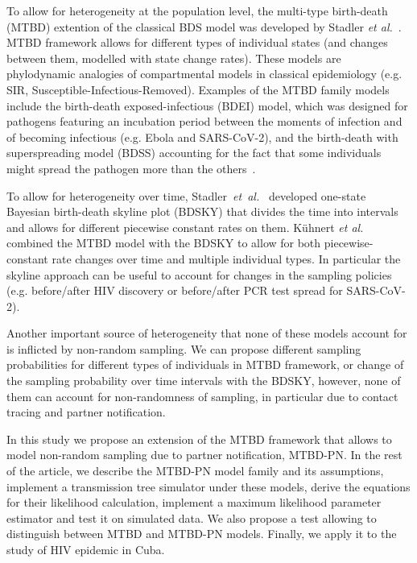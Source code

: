 \documentclass[a4paper,10pt]{article}
\begin{document}
To allow for heterogeneity at the population level, the multi-type birth-death (MTBD) extention of the classical BDS model was developed by Stadler \textit{et al.}~\cite{Stadler2013a}. MTBD framework allows for different types of individual states (and changes between them, modelled with state change rates). These models are phylodynamic analogies of compartmental models in classical epidemiology (e.g. SIR, Susceptible-Infectious-Removed).  Examples of the MTBD family models include the birth-death exposed-infectious (BDEI) model, which was designed for pathogens featuring an incubation period between the moments of infection and of becoming infectious (e.g. Ebola and SARS-CoV-2), and the birth-death with superspreading model (BDSS) accounting for the fact that some individuals might spread the pathogen more than the others~\cite{Stadler2014}.

To allow for heterogeneity over time, Stadler~\textit{et~al.}~\cite{Stadler2013} developed one-state Bayesian birth-death skyline plot (BDSKY) that divides the time into intervals and allows for different piecewise constant rates on them. K\"{u}hnert \textit{et al.}~\cite{Kuhnert2016} combined the MTBD model with the BDSKY to allow for both piecewise-constant rate changes over time and multiple individual types. In particular the skyline approach can be useful to account for changes in the sampling policies (e.g. before/after HIV discovery or before/after PCR test spread for SARS-CoV-2).


Another important source of heterogeneity that none of these models account for is inflicted by non-random sampling. We can propose different sampling probabilities for different types of individuals in MTBD framework, or change of the sampling probability over time intervals with the BDSKY, however, none of them can account for non-randomness of sampling, in particular due to contact tracing and partner notification. 

In this study we propose an extension of the MTBD framework that allows to model non-random sampling due to partner notification, MTBD-PN. In the rest of the article, we describe the MTBD-PN model family and its assumptions, implement a transmission tree simulator under these models, derive the equations for their likelihood calculation, implement a maximum likelihood parameter estimator and test it on simulated data. We also propose a test allowing to distinguish between MTBD and MTBD-PN models. Finally, we apply it to the study of HIV epidemic in Cuba.
\end{document}
